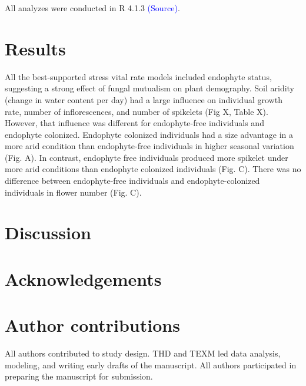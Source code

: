 \documentclass[12pt,english]{article}
\begin{document}
\begin{spacing}{1.9}
All  analyzes were conducted in R 4.1.3 \textcolor{blue}{(Source)}. 


\section*{Results}
All the best-supported stress vital rate models  included endophyte status, suggesting a strong 
effect of fungal mutualism on plant demography. Soil aridity (change in water content per day) had a large influence on individual growth rate, number of inflorescences, and number of spikelets (Fig X, Table X). However, that influence was different for endophyte-free individuals and endophyte colonized. Endophyte colonized individuals had a size advantage in a more arid condition than endophyte-free individuals in higher seasonal variation (Fig. A). In contrast, endophyte free individuals produced more spikelet under more arid conditions than endophyte colonized individuals (Fig. C). There was no difference between endophyte-free individuals and endophyte-colonized individuals in flower number (Fig. C). 

\section*{Discussion}





\section*{Acknowledgements}

\section*{Author contributions}
All authors contributed to study design. 
THD and TEXM led data analysis, modeling, and writing early drafts of the manuscript. 
All authors participated in preparing the manuscript for submission.




\newpage

\end{spacing}
\end{document}
